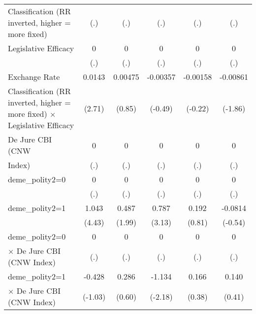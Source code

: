 {\begin{tabular}{l*{5}{c}}
Classification (RR inverted, higher = more fixed)&         (.)         &         (.)         &         (.)         &         (.)         &         (.)         \\
[1em]
Legislative Efficacy&           0         &           0         &           0         &           0         &           0         \\
                    &         (.)         &         (.)         &         (.)         &         (.)         &         (.)         \\
[1em]
Exchange Rate       &      0.0143\sym{**} &     0.00475         &    -0.00357         &    -0.00158         &    -0.00861         \\
Classification (RR inverted, higher = more fixed) $\times$ Legislative Efficacy&      (2.71)         &      (0.85)         &     (-0.49)         &     (-0.22)         &     (-1.86)         \\
[1em]
De Jure CBI (CNW    &           0         &           0         &           0         &           0         &           0         \\
Index)              &         (.)         &         (.)         &         (.)         &         (.)         &         (.)         \\
[1em]
deme\_polity2=0      &           0         &           0         &           0         &           0         &           0         \\
                    &         (.)         &         (.)         &         (.)         &         (.)         &         (.)         \\
[1em]
deme\_polity2=1      &       1.043\sym{***}&       0.487\sym{*}  &       0.787\sym{**} &       0.192         &     -0.0814         \\
                    &      (4.43)         &      (1.99)         &      (3.13)         &      (0.81)         &     (-0.54)         \\
[1em]
deme\_polity2=0      &           0         &           0         &           0         &           0         &           0         \\
$\times$ De Jure CBI (CNW Index)&         (.)         &         (.)         &         (.)         &         (.)         &         (.)         \\
[1em]
deme\_polity2=1      &      -0.428         &       0.286         &      -1.134\sym{*}  &       0.166         &       0.140         \\
$\times$ De Jure CBI (CNW Index)&     (-1.03)         &      (0.60)         &     (-2.18)         &      (0.38)         &      (0.41)         \\

\end{tabular}}
